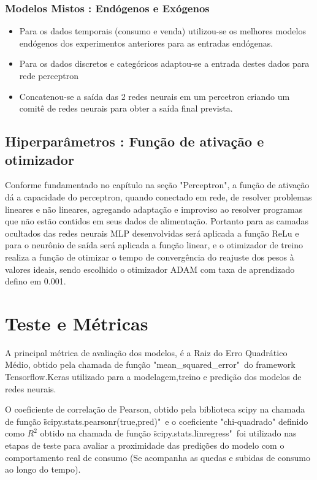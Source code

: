             \subsubsection{Modelos Mistos : Endógenos e Exógenos}
                \begin{itemize}
                    \item Para os dados temporais (consumo e venda) utilizou-se os melhores modelos endógenos dos experimentos anteriores para as entradas endógenas. 
                    \item Para os dados discretos e categóricos adaptou-se a entrada destes dados para rede perceptron
                    \item  Concatenou-se a saída das 2 redes neurais em um percetron criando um comitê de redes neurais para obter a saída final prevista.
                \end{itemize}
	\subsection{Hiperparâmetros : Função de ativação e otimizador}
        Conforme fundamentado no capítulo \label{cap:teoria} na seção "Perceptron", a função de ativação dá a capacidade do perceptron, quando conectado em rede, de resolver problemas lineares e não lineares, agregando adaptação e improviso ao resolver programas que não estão contidos em seus dados de alimentação.
        Portanto para as camadas ocultados das redes neurais MLP desenvolvidas será aplicada a função ReLu e para o neurônio de saída será aplicada a função linear, e o otimizador de treino realiza a função de otimizar o tempo de convergência do reajuste dos pesos à valores ideais, sendo escolhido o otimizador ADAM com taxa de aprendizado defino em 0.001.

    \section{Teste e Métricas}
       A principal métrica de avaliação dos modelos, é a Raiz do Erro Quadrático Médio, obtido pela chamada de função "mean\_squared\_error"\ do framework Tensorflow.Keras utilizado para a modelagem,treino e predição dos modelos de redes neurais.
       
        O coeficiente de correlação de Pearson, obtido pela biblioteca scipy na chamada de função \"scipy.stats.pearsonr(true,pred)"\ e o coeficiente "chi-quadrado" definido como $R^2$ obtido na chamada de função \"scipy.stats.linregress"\ foi utilizado nas etapas de teste para avaliar a proximidade das predições do modelo com o comportamento real de consumo (Se acompanha as quedas e subidas de consumo ao longo do tempo).\newline
       
